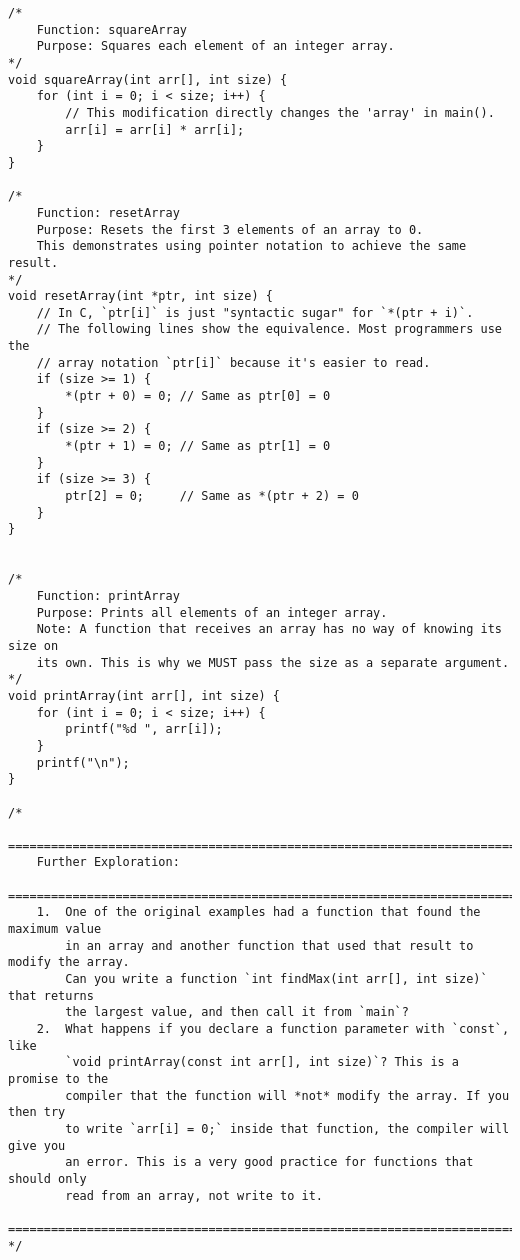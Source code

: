 \documentclass[11pt]{book}
\begin{document}
\begin{verbatim}
/*
    Function: squareArray
    Purpose: Squares each element of an integer array.
*/
void squareArray(int arr[], int size) {
    for (int i = 0; i < size; i++) {
        // This modification directly changes the 'array' in main().
        arr[i] = arr[i] * arr[i];
    }
}

/*
    Function: resetArray
    Purpose: Resets the first 3 elements of an array to 0.
    This demonstrates using pointer notation to achieve the same result.
*/
void resetArray(int *ptr, int size) {
    // In C, `ptr[i]` is just "syntactic sugar" for `*(ptr + i)`.
    // The following lines show the equivalence. Most programmers use the
    // array notation `ptr[i]` because it's easier to read.
    if (size >= 1) {
        *(ptr + 0) = 0; // Same as ptr[0] = 0
    }
    if (size >= 2) {
        *(ptr + 1) = 0; // Same as ptr[1] = 0
    }
    if (size >= 3) {
        ptr[2] = 0;     // Same as *(ptr + 2) = 0
    }
}


/*
    Function: printArray
    Purpose: Prints all elements of an integer array.
    Note: A function that receives an array has no way of knowing its size on
    its own. This is why we MUST pass the size as a separate argument.
*/
void printArray(int arr[], int size) {
    for (int i = 0; i < size; i++) {
        printf("%d ", arr[i]);
    }
    printf("\n");
}

/*
    ================================================================================
    Further Exploration:
    ================================================================================
    1.  One of the original examples had a function that found the maximum value
        in an array and another function that used that result to modify the array.
        Can you write a function `int findMax(int arr[], int size)` that returns
        the largest value, and then call it from `main`?
    2.  What happens if you declare a function parameter with `const`, like
        `void printArray(const int arr[], int size)`? This is a promise to the
        compiler that the function will *not* modify the array. If you then try
        to write `arr[i] = 0;` inside that function, the compiler will give you
        an error. This is a very good practice for functions that should only
        read from an array, not write to it.
    ================================================================================
*/

\end{verbatim}
\clearpage
\end{document}
